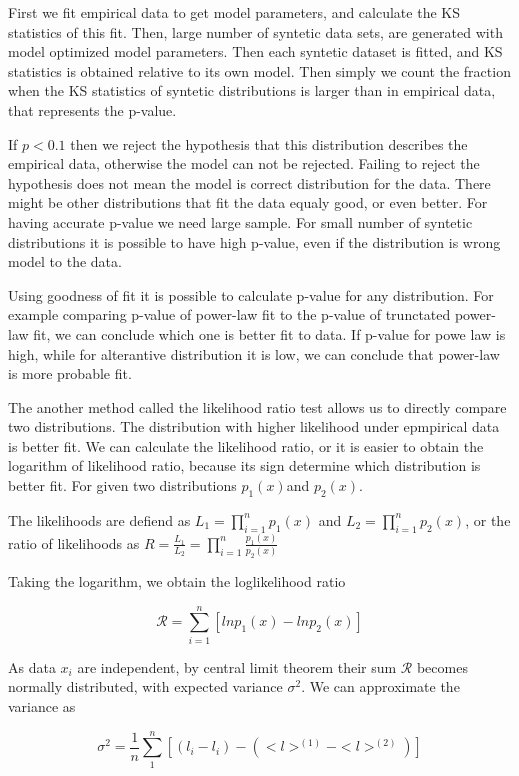 First we fit empirical data to get model parameters, and calculate the KS statistics of this fit. Then, large number of syntetic data sets, are generated with model optimized model parameters. Then each syntetic dataset is fitted, and KS statistics is obtained relative to its own model. Then simply we count the fraction when the KS statistics of syntetic distributions is larger than in empirical data, that represents the p-value. 

If $p<0.1$ then we reject the hypothesis that this distribution describes the empirical data, otherwise the model can not be rejected. Failing to reject the hypothesis does not mean the model is correct distribution for the data. There might be other distributions that fit the data equaly good, or even better. For having accurate p-value we need large sample. For small number of syntetic distributions it is possible to have high p-value, even if the distribution is wrong model to the data. 

Using goodness of fit it is possible to calculate p-value for any distribution. For example comparing p-value of power-law fit to the p-value of trunctated power-law fit, we can conclude which one is better fit to data. If p-value for powe law is high, while for alterantive distribution it is low, we can conclude that power-law is more probable fit. 

The another method called the likelihood ratio test allows us to directly compare two distributions. The distribution with higher likelihood under epmpirical data is better fit. We can calculate the likelihood ratio, or it is easier to obtain the logarithm of likelihood ratio, because its sign determine which distribution is better fit. For given two distributions $p_1(x)$and $p_2(x)$. 

The likelihoods are defiend as $L_1=\prod_{i=1}^{n}p_1(x)$ and $L_2=\prod_{i=1}^{n}p_2(x)$, or the ratio of likelihoods as $R=\frac{L_1}{L_2} = \prod_{i=1}^{n} \frac{p_1(x)}{p_2(x)}$

Taking the logarithm, we obtain the loglikelihood ratio

\begin{equation}
\mathcal{R} = \sum_{i=1}^{n} \left[ln p_1(x) - ln p_2(x)\right]
\end{equation}

As data $x_i$ are independent, by central limit theorem their sum $\mathcal{R}$ becomes normally distributed, with expected variance $\sigma^2$. We can approximate the variance as 

$$\sigma^2 = \frac{1}{n}\sum_{1}^{n}[(l_i - l_i) - (<l>^{(1)}- <l>^{(2)})]$$

